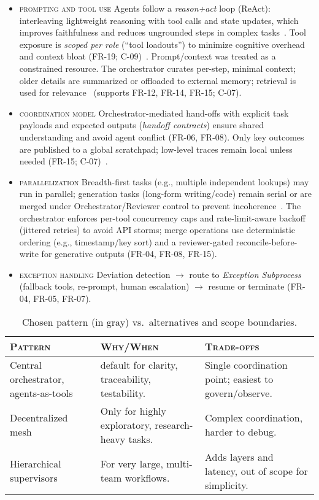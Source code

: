 \begin{itemize}
  \item \textsc{prompting and tool use} \quad Agents follow a \emph{reason+act} loop (ReAct): interleaving lightweight reasoning with tool calls and state updates, which improves faithfulness and reduces ungrounded steps in complex tasks~\parencite{yaoReAct2023}. Tool exposure is \emph{scoped per role} (\enquote{tool loadouts}) to minimize cognitive overhead and context bloat (\textsc{FR-19; C-09})~\parencite{breunig_context_fail,breunig_fix_context}. Prompt/context was treated as a constrained resource. The orchestrator curates per-step, minimal context; older details are summarized or offloaded to external memory; retrieval is used for relevance~\parencite{breunig_context_fail,breunig_fix_context} (supports \textsc{FR-12, FR-14, FR-15; C-07}).
  \item \textsc{coordination model} \quad Orchestrator-mediated hand-offs with explicit task payloads and expected outputs (\emph{handoff contracts}) ensure shared understanding and avoid agent conflict (\textsc{FR-06, FR-08}). Only key outcomes are published to a global scratchpad; low-level traces remain local unless needed (\textsc{FR-15; C-07})~\parencite{cognition_dont_build,langchain_multi_agents}.
  \item \textsc{parallelization} \quad Breadth-first tasks (e.g., multiple independent lookups) may run in parallel; generation tasks (long-form writing/code) remain serial or are merged under Orchestrator/Reviewer control to prevent incoherence~\parencite{langchain_multi_agents,cognition_dont_build}. The orchestrator enforces per-tool concurrency caps and rate-limit-aware backoff (jittered retries) to avoid API storms; merge operations use deterministic ordering (e.g., timestamp/key sort) and a reviewer-gated reconcile-before-write for generative outputs (\textsc{FR-04, FR-08, FR-15}).
  \item \textsc{exception handling} \quad Deviation detection $\rightarrow$ route to \emph{Exception Subprocess} (fallback tools, re-prompt, human escalation) $\rightarrow$ resume or terminate (\textsc{FR-04, FR-05, FR-07}).
\end{itemize}

\begin{table}[H]
  \centering
  \small
  \begin{tabular}{p{3.2cm} p{5cm} p{5cm}}
    \toprule
    \textsc{Pattern} & \textsc{Why/When} & \textsc{Trade-offs} \\
    \midrule
    \rowcolor{gray!13} Central orchestrator, agents-as-tools & default for clarity, traceability, testability. & Single coordination point; easiest to govern/observe. \\
    Decentralized mesh & Only for highly exploratory, research-heavy tasks. & Complex coordination, harder to debug. \\
    Hierarchical supervisors & For very large, multi-team workflows. & Adds layers and latency, out of scope for simplicity. \\
    \bottomrule
  \end{tabular}
  \caption{Chosen pattern (in gray) vs.~alternatives and scope boundaries.}
\end{table}

